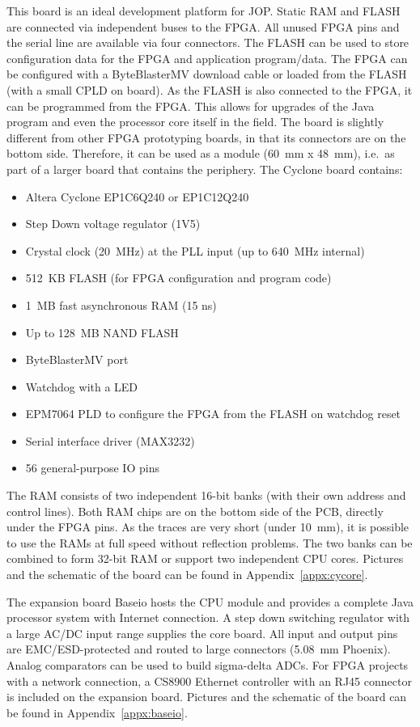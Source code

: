 This board is an ideal development platform for JOP. Static RAM and
FLASH are connected via independent buses to the FPGA. All unused
FPGA pins and the serial line are available via four connectors. The
FLASH can be used to store configuration data for the FPGA and
application program/data. The FPGA can be configured with a
ByteBlasterMV download cable or loaded from the FLASH (with a small
CPLD on board). As the FLASH is also connected to the FPGA, it can be
programmed from the FPGA. This allows for upgrades of the Java
program and even the processor core itself in the field. The board is
slightly different from other FPGA prototyping boards, in that its
connectors are on the bottom side. Therefore, it can be used as a
module (60~mm x 48~mm), i.e.\ as part of a larger board that contains
the periphery. The Cyclone board contains:
%
\begin{itemize}
\item Altera Cyclone EP1C6Q240 or EP1C12Q240
\item Step Down voltage regulator (1V5)
\item Crystal clock (20~MHz) at the PLL input (up to 640~MHz
    internal)
\item 512~KB FLASH (for FPGA configuration and program code)
\item 1~MB fast asynchronous RAM (15 ns)
\item Up to 128~MB NAND FLASH
\item ByteBlasterMV port
\item Watchdog with a LED
\item EPM7064 PLD to configure the FPGA from the FLASH on watchdog reset
\item Serial interface driver (MAX3232)
\item 56 general-purpose IO pins
\end{itemize}
%
The RAM consists of two independent 16-bit banks (with their own
address and control lines). Both RAM chips are on the bottom side of
the PCB, directly under the FPGA pins. As the traces are very short
(under 10~mm), it is possible to use the RAMs at full speed without
reflection problems. The two banks can be combined to form 32-bit
RAM or support two independent CPU cores. Pictures and the schematic
of the board can be found in Appendix~\ref{appx:cycore}.


The expansion board Baseio hosts the CPU module and provides a
complete Java processor system with Internet connection. A step down
switching regulator with a large AC/DC input range supplies the core
board. All input and output pins are EMC/ESD-protected and routed to
large connectors (5.08~mm Phoenix). Analog comparators can be used to
build sigma-delta ADCs. For FPGA projects with a network connection,
a CS8900 Ethernet controller with an RJ45 connector is included on
the expansion board. Pictures and the schematic of the board can be
found in Appendix~\ref{appx:baseio}.


